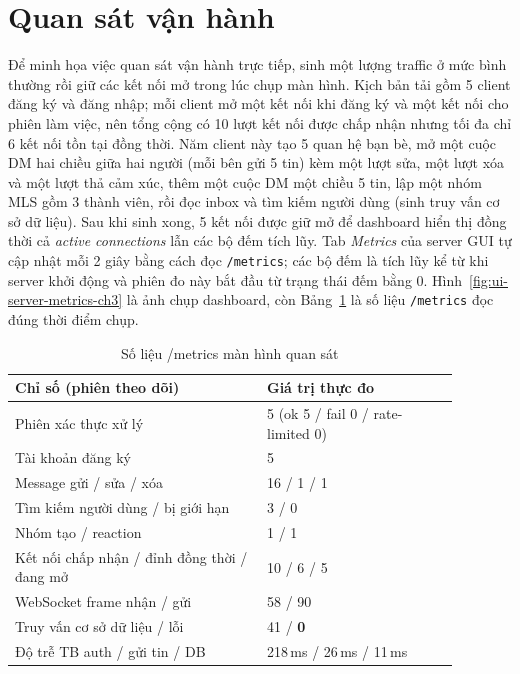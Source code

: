 \section{Quan sát vận hành}

Để minh họa việc quan sát vận hành trực tiếp, sinh một lượng traffic ở mức bình thường rồi giữ các kết nối mở trong lúc chụp màn hình. Kịch bản tải gồm 5 client đăng ký và đăng nhập; mỗi client mở một kết nối khi đăng ký và một kết nối cho phiên làm việc, nên tổng cộng có 10 lượt kết nối được chấp nhận nhưng tối đa chỉ 6 kết nối tồn tại đồng thời. Năm client này tạo 5 quan hệ bạn bè, mở một cuộc DM hai chiều giữa hai người (mỗi bên gửi 5 tin) kèm một lượt sửa, một lượt xóa và một lượt thả cảm xúc, thêm một cuộc DM một chiều 5 tin, lập một nhóm MLS gồm 3 thành viên, rồi đọc inbox và tìm kiếm người dùng (sinh truy vấn cơ sở dữ liệu). Sau khi sinh xong, 5 kết nối được giữ mở để dashboard hiển thị đồng thời cả \emph{active connections} lẫn các bộ đếm tích lũy. Tab \emph{Metrics} của server GUI tự cập nhật mỗi 2 giây bằng cách đọc \texttt{/metrics}; các bộ đếm là tích lũy kể từ khi server khởi động và phiên đo này bắt đầu từ trạng thái đếm bằng 0. Hình~\ref{fig:ui-server-metrics-ch3} là ảnh chụp dashboard, còn Bảng~\ref{tab:ops-metrics} là số liệu \texttt{/metrics} đọc đúng thời điểm chụp.

\begin{table}[H]
    \centering
    \small
    \begin{tabular}{|p{0.50\linewidth}|p{0.38\linewidth}|}
        \hline
        \textbf{Chỉ số (phiên theo dõi)} & \textbf{Giá trị thực đo} \\
        \hline
        Phiên xác thực xử lý & 5 (ok 5 / fail 0 / rate-limited 0) \\
        \hline
        Tài khoản đăng ký & 5 \\
        \hline
        Message gửi / sửa / xóa & 16 / 1 / 1 \\
        \hline
        Tìm kiếm người dùng / bị giới hạn & 3 / 0 \\
        \hline
        Nhóm tạo / reaction & 1 / 1 \\
        \hline
        Kết nối chấp nhận / đỉnh đồng thời / đang mở & 10 / 6 / 5 \\
        \hline
        WebSocket frame nhận / gửi & 58 / 90 \\
        \hline
        Truy vấn cơ sở dữ liệu / lỗi & 41 / \textbf{0} \\
        \hline
        Độ trễ TB auth / gửi tin / DB & 218\,ms / 26\,ms / 11\,ms \\
        \hline
    \end{tabular}
    \caption{Số liệu /metrics màn hình quan sát}
    \label{tab:ops-metrics}
\end{table}

